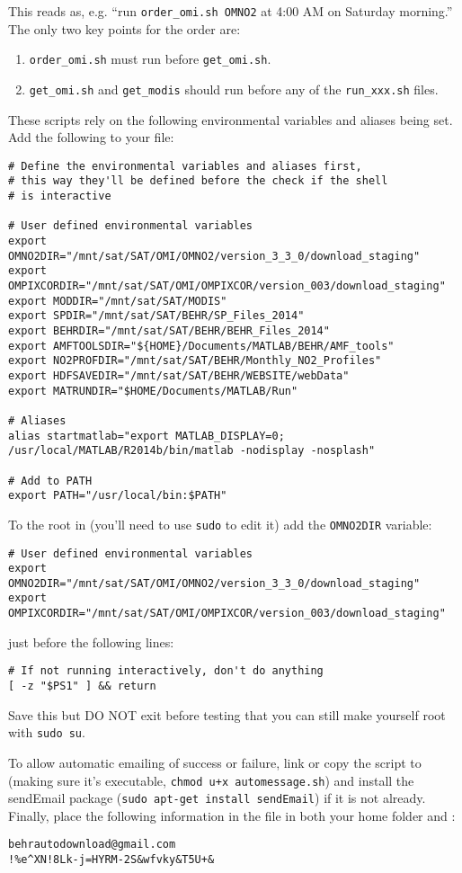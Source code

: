 \documentclass[12pt]{article}
\begin{document}
	This reads as, e.g. ``run \lstinline$order_omi.sh OMNO2$ at 4:00 AM on Saturday morning.''  The only two key points for the order are:
	\begin{enumerate}
	\item \lstinline$order_omi.sh$ must run before \lstinline$get_omi.sh$.
	\item \lstinline$get_omi.sh$ and \lstinline$get_modis$ should run before any of the \lstinline$run_xxx.sh$ files.
	\end{enumerate}
	
	These scripts rely on the following environmental variables and aliases being set. Add the following to your  file:
\begin{lstlisting}[basicstyle=\ttfamily\scriptsize]
# Define the environmental variables and aliases first,
# this way they'll be defined before the check if the shell
# is interactive

# User defined environmental variables
export OMNO2DIR="/mnt/sat/SAT/OMI/OMNO2/version_3_3_0/download_staging"
export OMPIXCORDIR="/mnt/sat/SAT/OMI/OMPIXCOR/version_003/download_staging"
export MODDIR="/mnt/sat/SAT/MODIS"
export SPDIR="/mnt/sat/SAT/BEHR/SP_Files_2014"
export BEHRDIR="/mnt/sat/SAT/BEHR/BEHR_Files_2014"
export AMFTOOLSDIR="${HOME}/Documents/MATLAB/BEHR/AMF_tools"
export NO2PROFDIR="/mnt/sat/SAT/BEHR/Monthly_NO2_Profiles"
export HDFSAVEDIR="/mnt/sat/SAT/BEHR/WEBSITE/webData"
export MATRUNDIR="$HOME/Documents/MATLAB/Run"

# Aliases
alias startmatlab="export MATLAB_DISPLAY=0; /usr/local/MATLAB/R2014b/bin/matlab -nodisplay -nosplash"

# Add to PATH
export PATH="/usr/local/bin:$PATH"
\end{lstlisting}

	To the root  in  (you'll need to use \lstinline$sudo$ to edit it) add the \lstinline$OMNO2DIR$ variable:
\begin{lstlisting}[basicstyle=\ttfamily\scriptsize]
# User defined environmental variables
export OMNO2DIR="/mnt/sat/SAT/OMI/OMNO2/version_3_3_0/download_staging"
export OMPIXCORDIR="/mnt/sat/SAT/OMI/OMPIXCOR/version_003/download_staging"
\end{lstlisting}
just before the following lines:
\begin{lstlisting}[basicstyle=\ttfamily\scriptsize]
# If not running interactively, don't do anything
[ -z "$PS1" ] && return
\end{lstlisting}

	Save this but DO NOT exit before testing that you can still make yourself root with \lstinline$sudo su$.
	
	To allow automatic emailing of success or failure, link or copy the  script to  (making sure it's executable, \lstinline$chmod u+x automessage.sh$) and install the sendEmail package (\lstinline$sudo apt-get install sendEmail$) if it is not already. Finally, place the following information in the file  in both your home folder and :
\begin{lstlisting}
behrautodownload@gmail.com
!%e^XN!8Lk-j=HYRM-2S&wfvky&T5U+&
\end{lstlisting}
\end{document}
